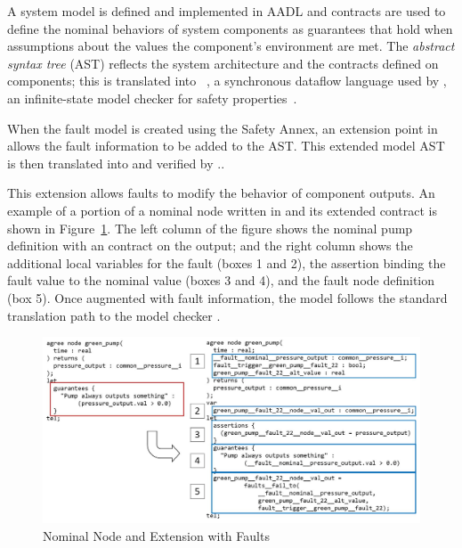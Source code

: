 A system model is defined and implemented in AADL and \agree contracts are used to define the nominal behaviors of system components as guarantees that hold when assumptions about the values the component's environment are met. The \agree \textit{abstract syntax tree} (AST) reflects the system architecture and the contracts defined on components; this is translated into \lustre~\cite{Halbwachs91:IEEE}, a synchronous dataflow language used by \jkind, an infinite-state model checker for safety properties~\cite{2017arXiv171201222G}.


When the fault model is created using the Safety Annex, an extension point in \agree allows the fault information to be added to the \agree AST. This extended model AST is then translated into \lustre and verified by \jkind.. 

This extension allows faults to modify the behavior of component outputs. An example of a portion of a nominal \agree node written in \lustre and its extended contract is shown in Figure~\ref{fig:lustre}. The left column of the figure shows the nominal \lustre pump definition with an \agree contract on the output; and the right column shows the additional local variables for the fault (boxes 1 and 2), the assertion binding the fault value to the nominal value (boxes 3 and 4), and the fault node definition (box 5). Once augmented with fault information, the \agree model follows the standard translation path to the model checker \jkind. 

\begin{figure}[h!]
	\hspace*{-2cm}
	\begin{center}
		\includegraphics[scale=0.3]{images/lustre.jpg}
		\caption{Nominal \agree Node and Extension with Faults}
		\label{fig:lustre}
	\end{center}
\end{figure}


